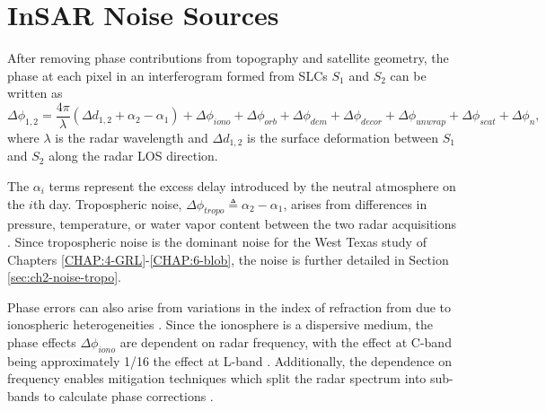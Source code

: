 \section{InSAR Noise Sources}
\label{sec:ch2-noise}
%
After removing phase contributions from topography and satellite geometry, the phase at each pixel in an interferogram formed from SLCs $S_1$ and $S_2$ can be written as
\begin{equation}
	\Delta \phi_{1, 2} = \frac{4 \pi}{\lambda} \left( \Delta d_{1,2} + \alpha_2 - \alpha_1 \right) + \Delta \phi_{iono} + \Delta \phi_{orb} + \Delta \phi_{dem} + \Delta \phi_{decor} + \Delta \phi_{unwrap} + \Delta \phi_{scat} + \Delta \phi_{n}  ,
	\label{eq:ch2-insar-noise-terms}
\end{equation}
where $ \lambda $ is the radar wavelength and $ \Delta d_{1,2} $ is the surface deformation between $S_1$ and $S_2$ along the radar LOS direction. 

The $\alpha_i$ terms represent the excess delay introduced by the neutral atmosphere on the $i$th day.
Tropospheric noise, $\Delta \phi_{tropo} \triangleq \alpha_2 - \alpha_1 $, arises from differences in pressure, temperature, or water vapor content between the two radar acquisitions \citep{Zebker1997AtmosphericEffectsInterferometric}.
Since tropospheric noise is the dominant noise for the West Texas study of Chapters \ref{CHAP:4-GRL}-\ref{CHAP:6-blob}, the noise is further detailed in Section \ref{sec:ch2-noise-tropo}.


Phase errors can also arise from variations in the index of refraction from due to ionospheric heterogeneities \citep{Gray2000InfluenceIonosphericElectron}. Since the ionosphere is a dispersive medium, the phase effects  $\Delta \phi_{iono}$ are dependent on radar frequency, with the effect at C-band being approximately 1/16 the effect at L-band \citep{Liang2019IonosphericCorrectionInsar}. Additionally, the dependence on frequency enables mitigation techniques which split the radar spectrum into sub-bands to calculate phase corrections \cite{Rosen2010MeasurementMitigationIonosphere}.


